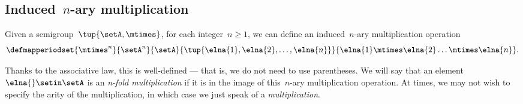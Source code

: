 \subsection{Induced~$n$-ary multiplication}
Given a semigroup~$\tup{\setA, \mtimes}$, for each integer~$n\geq1$, we can define an induced~$n$-ary multiplication operation
%
\begin{equation}
    \defmapperiodset{\mtimes^n}{\setA^n}{\setA}{\tup{\elna{1}, \elna{2}, \ldots, \elna{n}}}{ \elna{1} \mtimes \elna{2} \ldots \mtimes \elna{n}}.
\end{equation}


Thanks to the associative law, this is well-defined — that is, we do not need to use parentheses.
We will say that an element~$\elna{} \setin \setA$ is an \emph{n-fold multiplication} if it is in the image of this~$n$-ary multiplication operation.
At times, we may not wish to specify the arity of the multiplication, in which case we just speak of a \emph{multiplication}.

\showslides{
    \begin{forslides}
        \begin{equation}
            \label{eq:sg-mora}
            \mora
        \end{equation}
        \begin{equation}
            \label{eq:sg-morb}
            \morb
        \end{equation}
        \begin{equation}
            \label{eq:sg-morab}
            \morab
        \end{equation}
    \end{forslides}
}
